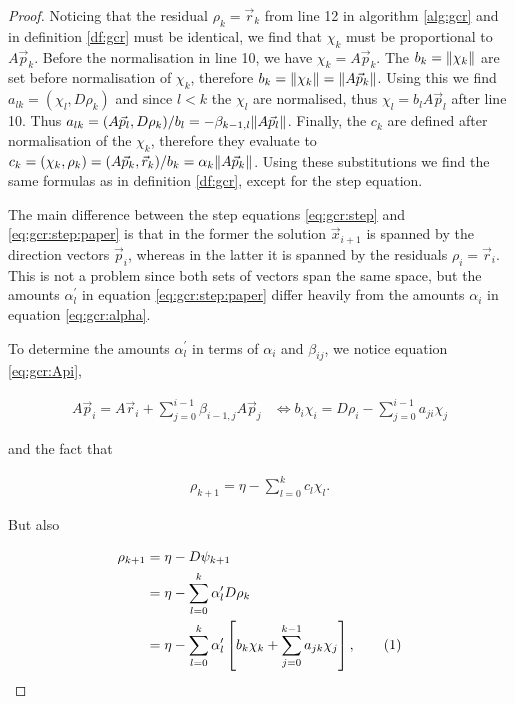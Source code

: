 \documentclass{article}
\newcommand\numberthis{\addtocounter{equation}{1}\tag{\theequation}}
\theoremstyle{plain} %
\theoremstyle{convention} %
\theoremstyle{remark} %
\numberwithin{equation}{section}
\begin{document}
\begin{proof}

Noticing that the residual $\rho_k = \vec{r}_k$ from line \num{12} in algorithm \ref{alg:gcr} and in definition \ref{df:gcr} must be identical, we find that $\chi_k$ must be proportional to $A \vec{p}_k$. Before the normalisation in line \num{10}, we have $\chi_k = A \vec{p}_k$. The $b_k = \norm{\chi_k}$ are set before normalisation of $\chi_k$, therefore $b_k = \norm{\chi_k} = \norm{A \vec{p}_k}$. Using this we find $a_{lk} = (\chi_l, D \rho_k)$ and since $l < k$ the $\chi_l$ are normalised, thus $\chi_l = b_l A \vec{p}_l$ after line \num{10}. Thus $a_{lk} = (A \vec{p}_l, D \rho_k)/b_l = - \beta_{k-1,l} \norm{A \vec{p}_l}$. Finally, the $c_k$ are defined after normalisation of the $\chi_k$, therefore they evaluate to $c_k = (\chi_k, \rho_k) = (A \vec{p}_k, \vec{r}_k)/b_k = \alpha_k \norm{A \vec{p}_k}$. Using these substitutions we find the same formulas as in definition \ref{df:gcr}, except for the step equation.

The main difference between the step equations \eqref{eq:gcr:step} and \eqref{eq:gcr:step:paper} is that in the former the solution $\vec{x}_{i+1}$ is spanned by the direction vectors $\vec{p}_i$, whereas in the latter it is spanned by the residuals $\rho_i = \vec{r}_i$. This is not a problem since both sets of vectors span the same space, but the amounts $\alpha^{\prime}_l$ in equation \eqref{eq:gcr:step:paper} differ heavily from the amounts $\alpha_i$ in equation \eqref{eq:gcr:alpha}.

To determine the amounts $\alpha^{\prime}_l$ in terms of $\alpha_i$ and $\beta_{ij}$, we notice equation \eqref{eq:gcr:Api},

\begin{align}
    A \vec{p}_{i} = A \vec{r}_{i} + \sum_{j=0}^{i-1} \beta_{i-1,j} A \vec{p}_j &\iff b_{i} \chi_{i} = D \rho_i - \sum_{j=0}^{i-1} a_{ji} \chi_j \label{eq:gcr:Api:equiv}
\end{align}

and the fact that

\begin{align}
    \rho_{k+1} = \eta - \sum_{l=0}^k c_l \chi_l. \label{eq:gcr:paper:rho1}
\end{align}

But also 

\begin{align*}
    \rho_{k+1} &= \eta - D \psi_{k+1} \\
    &= \eta - \sum_{l=0}^k \alpha^{\prime}_l D \rho_k \\
    &= \eta - \sum_{l=0}^k \alpha^{\prime}_l \left[ b_k \chi_k + \sum_{j=0}^{k-1} a_{jk} \chi_j \right], \numberthis \label{eq:gcr:paper:rho2}
\end{align*}    


\end{proof}
\end{document}

